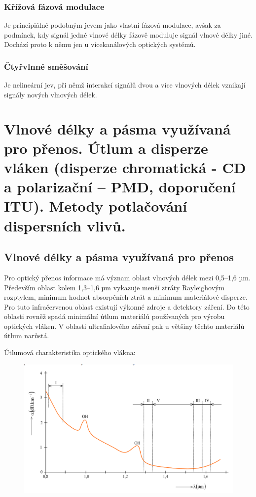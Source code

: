 \subsubsection{Křížová fázová modulace}
Je principiálně podobným jevem jako vlastní fázová modulace, avšak za podmínek, kdy signál jedné vlnové délky fázově moduluje signál vlnové délky jiné. Dochází proto k němu jen u vícekanálových optických systémů.

\subsubsection{Čtyřvlnné směšování}
Je nelineární jev, při němž interakcí signálů dvou a více vlnových délek vznikají signály nových vlnových délek.

\clearpage
\section{Vlnové délky a pásma využívaná pro přenos. Útlum a disperze vláken (disperze chromatická - CD a polarizační – PMD, doporučení ITU). Metody potlačování dispersních vlivů.}

\subsection{Vlnové délky a pásma využívaná pro přenos}
Pro optický přenos informace má význam oblast vlnových délek mezi 0,5–1,6 µm. Především oblast kolem 1,3–1,6 µm vykazuje menší ztráty Rayleighovým rozptylem, minimum hodnot absorpčních ztrát a minimum materiálové disperze. Pro tuto infračervenou oblast existují výkonné zdroje a detektory záření. Do této oblasti rovněž spadá minimální útlum materiálů používaných pro výrobu optických vláken. V oblasti ultrafialového záření pak u většiny těchto materiálů útlum narůstá.

Útlumová charakteristika optického vlákna:
\begin{figure}[!ht]
\begin{center}
    \includegraphics[scale=0.9]{obrazky/okna.png}
  \end{center}
\end{figure}

